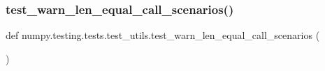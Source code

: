 \subsubsection{\texorpdfstring{test\+\_\+warn\+\_\+len\+\_\+equal\+\_\+call\+\_\+scenarios()}{test\_warn\_len\_equal\_call\_scenarios()}}
{\footnotesize\ttfamily def numpy.\+testing.\+tests.\+test\+\_\+utils.\+test\+\_\+warn\+\_\+len\+\_\+equal\+\_\+call\+\_\+scenarios (\begin{DoxyParamCaption}{ }\end{DoxyParamCaption})}

